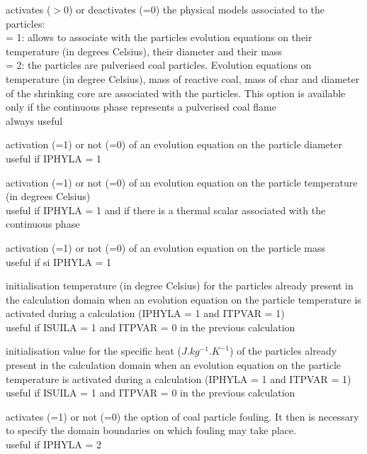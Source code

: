 {activates ($>$0) or deactivates (=0) the physical models associated to the
particles:\\ 
\hspace*{1.3cm} = 1: allows to associate with the particles evolution
equations on their temperature (in degrees Celsius), their diameter and
their mass\\
\hspace*{1.3cm} = 2: the particles are pulverised coal particles.
Evolution equations on temperature (in degree Celsius), mass of
reactive coal, mass of char and diameter of the shrinking core are
associated with the particles. This option is available only if the
continuous phase represents a pulverised coal flame\\
always useful}

{activation (=1) or not (=0) of an evolution equation on the particle
diameter\\ 
useful if IPHYLA = 1}

{activation (=1) or not (=0) of an evolution equation on the particle
temperature (in degrees Celsius)\\
useful if IPHYLA = 1 and if there is a thermal scalar associated with
the continuous phase}

{activation (=1) or not (=0) of an evolution equation on the
particle mass\\ 
useful if si IPHYLA = 1}

{initialisation temperature (in degree Celsius) for the particles already
present in the calculation domain when an evolution equation on
the particle temperature is activated during a calculation (IPHYLA =
1 and ITPVAR = 1)\\
useful if ISUILA = 1 and ITPVAR = 0 in the previous calculation}

{initialisation value for the specific heat ($J.kg^{-1}.K^{-1}$) of the
particles already present in the calculation domain when an evolution equation
on the particle temperature is activated during a calculation (IPHYLA =
1 and ITPVAR = 1)\\
useful if ISUILA = 1 and ITPVAR = 0 in the previous calculation}

{activates (=1) or not (=0) the option of coal particle
fouling. It then is necessary to specify the domain boundaries
on which fouling may take place.\\ 
useful if IPHYLA = 2}

